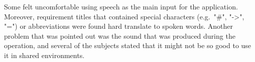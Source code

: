 Some felt uncomfortable using speech as the main input for the application. Moreover, requirement titles that contained special characters (e.g.\ "\#", "->", "=") or abbreviations were found hard translate to spoken words. Another problem that was pointed out was the sound that was produced during the operation, and several of the subjects stated that it might not be so good to use it in shared environments. 


